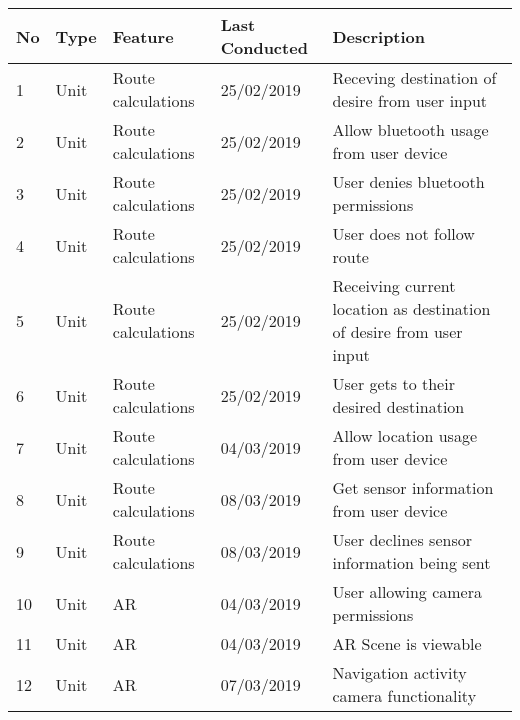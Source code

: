 \usepackage{rotating}
\usepackage{colortbl,booktabs}
\usepackage[paper=portrait,pagesize]{typearea}
\usepackage[a4paper, total={6in, 8in}]{geometry}
\usepackage{ulem}

\newpage
{}
\begin{turn}{-0}
\begin{tabular}{ | l | l | l | l | l |}
\hline
	\textbf{No} & \textbf{Type} & \textbf{Feature} & \textbf{Last Conducted} & \textbf{Description}\\ \hline
	
	1 & Unit & Route calculations & 25/02/2019 & Receving destination of desire from user input\\ \hline
	
	2 & Unit & Route calculations &25/02/2019& Allow bluetooth usage from user device\\ \hline
	
	3 & Unit & Route calculations &25/02/2019 & User denies bluetooth permissions\\ \hline
	
	4 & Unit & Route calculations & 25/02/2019& User does not follow route\\ \hline
	
	5 & Unit & Route calculations & 25/02/2019 & Receiving current location as destination of desire from user input\\ \hline
	
	6 & Unit & Route calculations & 25/02/2019 & User gets to their desired destination\\ \hline
	
	7 & Unit & Route calculations & 04/03/2019& Allow location usage from user device  \\ \hline
	
	8 & Unit & Route calculations & 08/03/2019 & Get sensor information from user device\\ \hline
	
	9 & Unit & Route calculations & 08/03/2019 & User declines sensor information being sent\\ \hline
	
	10 & Unit & AR & 04/03/2019& User allowing camera permissions \\ \hline
	
	11 & Unit & AR & 04/03/2019& AR Scene is viewable \\ \hline
	
	12 & Unit & AR & 07/03/2019 & Navigation activity camera functionality \\ \hline
	

\end{tabular}
\end{turn}

